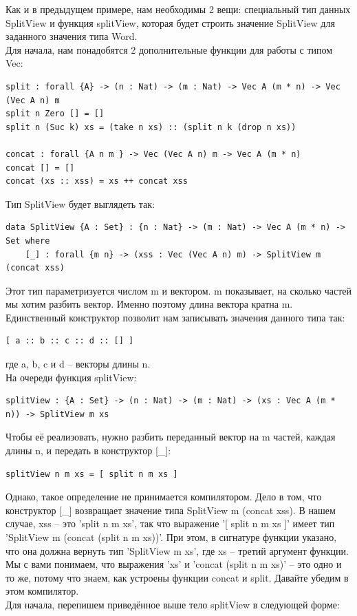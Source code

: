 \documentclass[8pt]{extarticle}
\begin{document}
Как и в предыдущем примере, нам необходимы 2 вещи: специальный тип данных SplitView и функция splitView, которая будет строить значение SplitView для заданного значения типа Word.\\
Для начала, нам понадобятся 2 дополнительные функции для работы с типом Vec:
\begin{lstlisting}
split : forall {A} -> (n : Nat) -> (m : Nat) -> Vec A (m * n) -> Vec (Vec A n) m
split n Zero [] = []
split n (Suc k) xs = (take n xs) :: (split n k (drop n xs))

concat : forall {A n m } -> Vec (Vec A n) m -> Vec A (m * n)
concat [] = []
concat (xs :: xss) = xs ++ concat xss
\end{lstlisting}
Тип SplitView будет выглядеть так:
\begin{lstlisting}
data SplitView {A : Set} : {n : Nat} -> (m : Nat) -> Vec A (m * n) -> Set where
	[_] : forall {m n} -> (xss : Vec (Vec A n) m) -> SplitView m (concat xss)
\end{lstlisting}
Этот тип параметризуется числом m и вектором. m показывает, на сколько частей мы хотим разбить вектор. Именно поэтому длина вектора кратна m. Единственный конструктор позволит нам записывать значения данного типа так:
\begin{lstlisting}
[ a :: b :: c :: d :: [] ]
\end{lstlisting}
где a, b, c и d -- векторы длины n.\\
На очереди функция splitView:
\begin{lstlisting}
splitView : {A : Set} -> (n : Nat) -> (m : Nat) -> (xs : Vec A (m * n)) -> SplitView m xs
\end{lstlisting}
Чтобы её реализовать, нужно разбить переданный вектор на m частей, каждая длины n, и передать в конструктор [\_]:
\begin{lstlisting}
splitView n m xs = [ split n m xs ]
\end{lstlisting}
Однако, такое определение не принимается компилятором. Дело в том, что конструктор [\_] возвращает значение типа SplitView m (concat xss). В нашем случае, xss -- это 'split n m xs', так что выражение '[ split n m xs ]' имеет тип 'SplitView m (concat (split n m xs))'. При этом, в сигнатуре функции указано, что она должна вернуть тип 'SplitView m xs', где xs -- третий аргумент функции. Мы с вами понимаем, что выражения 'xs' и 'concat (split n m xs)' -- это одно и то же, потому что знаем, как устроены функции concat и split. Давайте убедим в этом компилятор.\\
Для начала, перепишем приведённое выше тело splitView в следующей форме:
\end{document}
